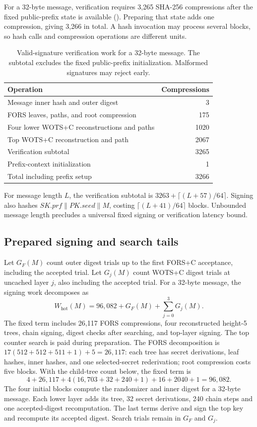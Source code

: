 \documentclass[a4paper,envcountsame,runningheads]{llncs}
\begin{document}
For a 32-byte message, verification requires 3,265 SHA-256 compressions after the fixed public-prefix state is available (). Preparing that state adds one compression, giving 3,266 in total. A hash invocation may process several blocks, so hash calls and compression operations are different units.

\begin{table}[t]
\caption{Valid-signature verification work for a 32-byte message. The subtotal excludes the fixed public-prefix initialization. Malformed signatures may reject early.}\label{tab:work}
\centering\small
\begin{tabular}{P{61mm}r}\toprule
Operation & Compressions\\\midrule
Message inner hash and outer digest &3\\
FORS leaves, paths, and root compression &175\\
Four lower WOTS+C reconstructions and paths &1020\\
Top WOTS+C reconstruction and path &2067\\\midrule
Verification subtotal &3265\\
Prefix-context initialization &1\\\midrule
Total including prefix setup &3266\\\bottomrule
\end{tabular}
\end{table}

For message length $L$, the verification subtotal is $3263+\lceil(L+57)/64\rceil$. Signing also hashes $SK.prf\|PK.seed\|M$, costing $\lceil(L+41)/64\rceil$ blocks. Unbounded message length precludes a universal fixed signing or verification latency bound.

\subsection{Prepared signing and search tails}
Let $G_F(M)$ count outer digest trials up to the first FORS+C acceptance, including the accepted trial. Let $G_j(M)$ count WOTS+C digest trials at uncached layer $j$, also including the accepted trial. For a 32-byte message, the signing work decomposes as
\begin{equation}\label{eq:signwork}
 W_{\mathrm{hot}}(M)=96{,}082+G_F(M)+\sum_{j=0}^{3}G_j(M).
\end{equation}
The fixed term includes 26,117 FORS compressions, four reconstructed height-5 trees, chain signing, digest checks after searching, and top-layer signing. The top counter search is paid during preparation. The FORS decomposition is $17(512+512+511+1)+5=26{,}117$: each tree has secret derivations, leaf hashes, inner hashes, and one selected-secret rederivation; root compression costs five blocks. With the child-tree count below, the fixed term is
\[
 4+26{,}117+4(16{,}703+32+240+1)+16+2040+1=96{,}082.
\]
The four initial blocks compute the randomizer and inner digest for a 32-byte message. Each lower layer adds its tree, 32 secret derivations, 240 chain steps and one accepted-digest recomputation. The last terms derive and sign the top key and recompute its accepted digest. Search trials remain in $G_F$ and $G_j$.
\end{document}
